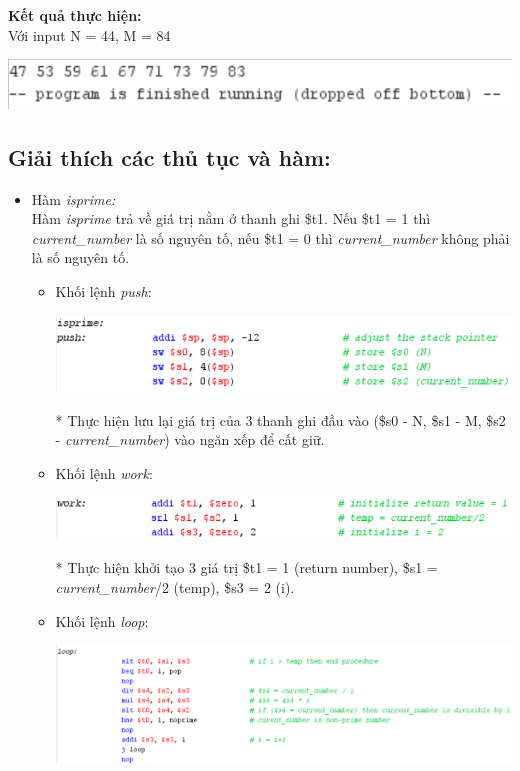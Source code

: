 \documentclass[12pt,a4paper,oneside]{article}
\begin{document}
\textbf{Kết quả thực hiện:}
\\Với input N = 44, M = 84
\begin{center}
\includegraphics[scale=1]{18}
\end{center}
\pagebreak
\subsection*{Giải thích các thủ tục và hàm:}
\begin{itemize}
	\item Hàm \textit{isprime:}
	\\Hàm \textit{isprime} trả về giá trị nằm ở thanh ghi \$t1. Nếu \$t1 = 1 thì \textit{current\_number} là số nguyên tố, nếu \$t1 = 0 thì \textit{current\_number} không phải là số nguyên tố.
	\begin{itemize}
		\item Khối lệnh \textit{push}:
		\begin{center}
		\includegraphics[scale=1]{13}
		\end{center}
		* Thực hiện lưu lại giá trị của 3 thanh ghi đầu vào (\$s0 - N, \$s1 - M, \$s2 - \textit{current\_number}) vào ngăn xếp để cất giữ.
		\item Khối lệnh \textit{work}:
		\begin{center}
		\includegraphics[scale=1]{14}
		\end{center}
		* Thực hiện khởi tạo 3 giá trị \$t1 = 1 (return number), \$s1 = \textit{current\_number}/2 (temp), \$s3 = 2 (i).
		\item Khối lệnh \textit{loop}:
		\begin{center}
		\includegraphics[scale=1]{15}

\end{center}
\end{itemize}
\end{itemize}
\end{document}
